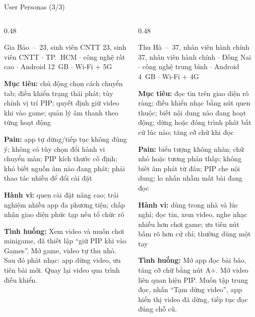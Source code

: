 \begin{frame}{User Personas (3/3)}
\linespread{0.88}%
\begin{columns}[T]
\begin{column}{0.48\textwidth}
\begin{block}{\small Gia Bảo~--~23, sinh viên CNTT}
{\tiny\color{TextGray} 23, sinh viên CNTT $\cdot$ TP.\ HCM $\cdot$ công nghệ rất cao $\cdot$ Android 12~GB $\cdot$ Wi-Fi + 5G}\par\vspace{0.6mm}
{\tiny\textbf{Mục tiêu:} chủ động chọn cách chuyển tab; điều khiển trạng thái phát; tùy chỉnh vị trí PIP; quyết định giữ video khi vào game; quản lý âm thanh theo từng hoạt động}\par\vspace{0.4mm}
{\tiny\textbf{Pain:} app tự dừng/tiếp tục không đúng ý; không có tùy chọn đổi hành vi chuyển màn; PIP kích thước cố định; khó biết nguồn âm nào đang phát; phải thao tác nhiều để đổi cài đặt}\par\vspace{0.4mm}
{\tiny\textbf{Hành vi:} quen cài đặt nâng cao; trải nghiệm nhiều app đa phương tiện; chấp nhận giao diện phức tạp nếu tổ chức rõ}\par\vspace{0.4mm}
{\tiny\textbf{Tình huống:} Xem video và muốn chơi minigame, đã thiết lập ``giữ PIP khi vào Games''. Mở game, video tự thu nhỏ. Sau đó phát nhạc: app dừng video, ưu tiên bài mới. Quay lại video qua trình điều khiển.}
\end{block}
\end{column}
\begin{column}{0.48\textwidth}
\begin{block}{\small Thu Hà~--~37, nhân viên hành chính}
{\tiny\color{TextGray} 37, nhân viên hành chính $\cdot$ Đồng Nai $\cdot$ công nghệ trung bình $\cdot$ Android 4~GB $\cdot$ Wi-Fi + 4G}\par\vspace{0.6mm}
{\tiny\textbf{Mục tiêu:} đọc tin trên giao diện rõ ràng; điều khiển nhạc bằng nút quen thuộc; biết nội dung nào đang hoạt động; dừng hoặc đóng trình phát bất cứ lúc nào; tăng cỡ chữ khi đọc}\par\vspace{0.4mm}
{\tiny\textbf{Pain:} biểu tượng không nhãn; chữ nhỏ hoặc tương phản thấp; không biết âm phát từ đâu; PIP che nội dung; lo nhấn nhầm mất bài đang đọc}\par\vspace{0.4mm}
{\tiny\textbf{Hành vi:} dùng trong nhà và lúc nghỉ; đọc tin, xem video, nghe nhạc nhiều hơn chơi game; ưu tiên nút bấm rõ hơn cử chỉ; thường dùng một tay}\par\vspace{0.4mm}
{\tiny\textbf{Tình huống:} Mở app đọc bài báo, tăng cỡ chữ bằng nút A+. Mở video liên quan hiện PIP. Muốn tập trung đọc, nhấn ``Tạm dừng video'', app hiển thị video đã dừng, tiếp tục đọc đúng chỗ cũ.}
\end{block}
\end{column}
\end{columns}
\end{frame}

